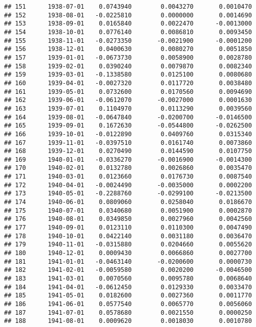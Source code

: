 \documentclass[
]{article}
\begin{document}
\begin{verbatim}
## 151      1938-07-01    0.0743940        0.0043270       0.0010470
## 152      1938-08-01   -0.0225810        0.0000000       0.0014690
## 153      1938-09-01    0.0165840        0.0022470      -0.0013000
## 154      1938-10-01    0.0776140        0.0086810       0.0093450
## 155      1938-11-01   -0.0273350       -0.0021900      -0.0001200
## 156      1938-12-01    0.0400630        0.0080270       0.0051850
## 157      1939-01-01   -0.0673730        0.0058900       0.0028780
## 158      1939-02-01    0.0390240        0.0079870       0.0082340
## 159      1939-03-01   -0.1338580        0.0125100       0.0080680
## 160      1939-04-01   -0.0027320        0.0117720       0.0038480
## 161      1939-05-01    0.0732600        0.0170560       0.0094690
## 162      1939-06-01   -0.0612070       -0.0027000       0.0001630
## 163      1939-07-01    0.1104970        0.0113290       0.0039560
## 164      1939-08-01   -0.0647840       -0.0200700      -0.0146500
## 165      1939-09-01    0.1672630       -0.0544800      -0.0262500
## 166      1939-10-01   -0.0122890        0.0409760       0.0315340
## 167      1939-11-01   -0.0397510        0.0161740       0.0073860
## 168      1939-12-01    0.0270490        0.0144590       0.0107750
## 169      1940-01-01   -0.0336270       -0.0016900      -0.0014300
## 170      1940-02-01    0.0132780        0.0026860       0.0035470
## 171      1940-03-01    0.0123660        0.0176730       0.0087540
## 172      1940-04-01   -0.0024490       -0.0035000       0.0002200
## 173      1940-05-01   -0.2288760       -0.0299100      -0.0213500
## 174      1940-06-01    0.0809060        0.0258040       0.0186670
## 175      1940-07-01    0.0340680        0.0051900       0.0002870
## 176      1940-08-01    0.0349850        0.0027960       0.0042560
## 177      1940-09-01    0.0123110        0.0110300       0.0047490
## 178      1940-10-01    0.0422140        0.0031180       0.0036470
## 179      1940-11-01   -0.0315880        0.0204660       0.0055620
## 180      1940-12-01    0.0009430        0.0066860       0.0027700
## 181      1941-01-01   -0.0463140       -0.0200600       0.0000730
## 182      1941-02-01   -0.0059580        0.0020200      -0.0046500
## 183      1941-03-01    0.0070560        0.0095780       0.0068640
## 184      1941-04-01   -0.0612450        0.0129330       0.0033470
## 185      1941-05-01    0.0182600        0.0027360       0.0011770
## 186      1941-06-01    0.0577540        0.0065770       0.0056060
## 187      1941-07-01    0.0578680        0.0021550       0.0000250
## 188      1941-08-01    0.0009620        0.0018030       0.0010780

\end{verbatim}
\end{document}
